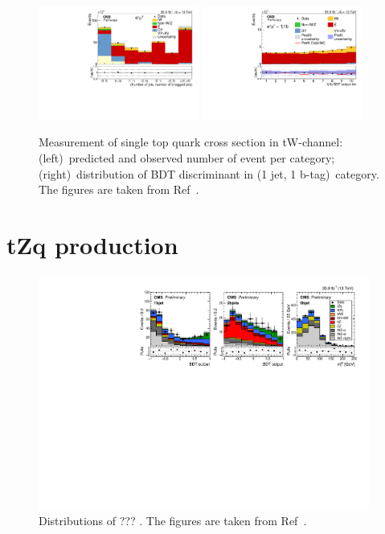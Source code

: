 \documentclass[12pt]{article}
\begin{document}
\begin{figure}[!htb]
\begin{center}
\includegraphics[width=0.47\textwidth]{tW-categories.pdf}\hspace{0.02\textwidth}
\includegraphics[width=0.47\textwidth]{tW-bdt.pdf}
\caption{Measurement of single top quark cross section in tW-channel: (left)~predicted and observed number of event per category; (right)~distribution of BDT discriminant in (1 jet, 1 b-tag)~category. The figures are taken from Ref~\cite{tw-inc}.}
\end{center}
\end{figure}

\section{tZq production}

\begin{figure}[!htb]
\begin{center}
\includegraphics[width=0.97\textwidth]{tZq-fit.pdf}
\caption{Distributions of ??? . The figures are taken from Ref~\cite{tZq-inc}.}
\end{center}
\end{figure}
\end{document}
